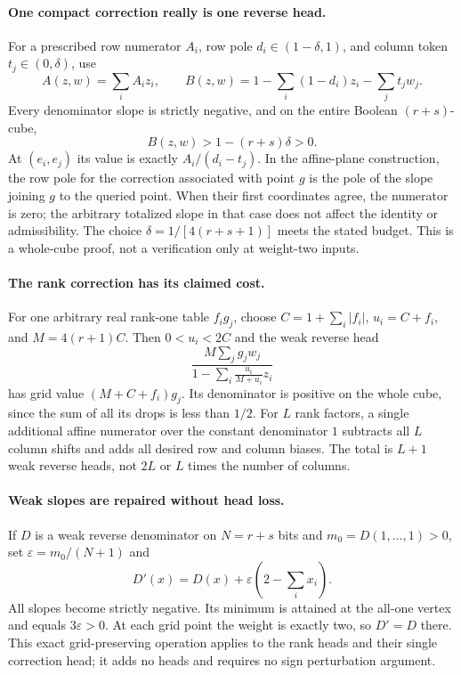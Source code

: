 \documentclass[11pt]{article}
\begin{document}
\paragraph{One compact correction really is one reverse head.}
For a prescribed row numerator $A_i$, row pole $d_i\in(1-\delta,1)$,
and column token $t_j\in(0,\delta)$, use
\[
 A(z,w)=\sum_i A_i z_i,\qquad
 B(z,w)=1-\sum_i(1-d_i)z_i-\sum_jt_jw_j.
\]
Every denominator slope is strictly negative, and on the entire Boolean
$(r+s)$-cube,
\[
 B(z,w)>1-(r+s)\delta>0.
\]
At $(e_i,e_j)$ its value is exactly $A_i/(d_i-t_j)$.  In the affine-plane
construction, the row pole for the correction associated with point $g$
is the pole of the slope joining $g$ to the queried point.  When their
first coordinates agree, the numerator is zero; the arbitrary totalized
slope in that case does not affect the identity or admissibility.
The choice $\delta=1/[4(r+s+1)]$ meets the stated budget.  This is a
whole-cube proof, not a verification only at weight-two inputs.

\paragraph{The rank correction has its claimed cost.}
For one arbitrary real rank-one table $f_i g_j$, choose
$C=1+\sum_i|f_i|$, $u_i=C+f_i$, and $M=4(r+1)C$.
Then $0<u_i<2C$ and the weak reverse head
\[
 \frac{M\sum_jg_jw_j}
 {1-\sum_i\frac{u_i}{M+u_i}z_i}
\]
has grid value $(M+C+f_i)g_j$.  Its denominator is positive on the
whole cube, since the sum of all its drops is less than $1/2$.
For $L$ rank factors, a single additional affine numerator over the
constant denominator $1$ subtracts all $L$ column shifts and adds all
desired row and column biases.  The total is $L+1$ weak reverse heads,
not $2L$ or $L$ times the number of columns.

\paragraph{Weak slopes are repaired without head loss.}
If $D$ is a weak reverse denominator on $N=r+s$ bits and
$m_0=D(1,\ldots,1)>0$, set $\varepsilon=m_0/(N+1)$ and
\[
 D'(x)=D(x)+\varepsilon\left(2-\sum_i x_i\right).
\]
All slopes become strictly negative.  Its minimum is attained at the
all-one vertex and equals $3\varepsilon>0$.  At each grid point the
weight is exactly two, so $D'=D$ there.  This exact grid-preserving
operation applies to the rank heads and their single correction head;
it adds no heads and requires no sign perturbation argument.
\end{document}
